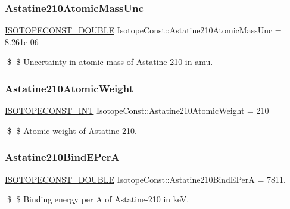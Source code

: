 \subsubsection{\texorpdfstring{Astatine210\+Atomic\+Mass\+Unc}{Astatine210AtomicMassUnc}}
{\footnotesize\ttfamily \mbox{\hyperlink{group___isotope_const-_macros_ga8f45a7272ce02c0b4c65c44636ed719a}{I\+S\+O\+T\+O\+P\+E\+C\+O\+N\+S\+T\+\_\+\+D\+O\+U\+B\+LE}} Isotope\+Const\+::\+Astatine210\+Atomic\+Mass\+Unc = 8.\+261e-\/06}

\$ \$ Uncertainty in atomic mass of Astatine-\/210 in amu. \mbox{\label{group___isotope_const-_astatine-_at210_ga1627433dded665b584d9c021a93bd86a}} 
\subsubsection{\texorpdfstring{Astatine210\+Atomic\+Weight}{Astatine210AtomicWeight}}
{\footnotesize\ttfamily \mbox{\hyperlink{group___isotope_const-_macros_ga5f18360b3e99483a35c32d789e62621c}{I\+S\+O\+T\+O\+P\+E\+C\+O\+N\+S\+T\+\_\+\+I\+NT}} Isotope\+Const\+::\+Astatine210\+Atomic\+Weight = 210}

\$ \$ Atomic weight of Astatine-\/210. \mbox{\label{group___isotope_const-_astatine-_at210_ga782a37d96b2f2b2ca971cc1b1bdbc0a2}} 
\subsubsection{\texorpdfstring{Astatine210\+Bind\+E\+PerA}{Astatine210BindEPerA}}
{\footnotesize\ttfamily \mbox{\hyperlink{group___isotope_const-_macros_ga8f45a7272ce02c0b4c65c44636ed719a}{I\+S\+O\+T\+O\+P\+E\+C\+O\+N\+S\+T\+\_\+\+D\+O\+U\+B\+LE}} Isotope\+Const\+::\+Astatine210\+Bind\+E\+PerA = 7811.}

\$ \$ Binding energy per A of Astatine-\/210 in keV. \mbox{\label{group___isotope_const-_astatine-_at210_ga410b9b9d5949af7026432b7f56d1cb86}} 
